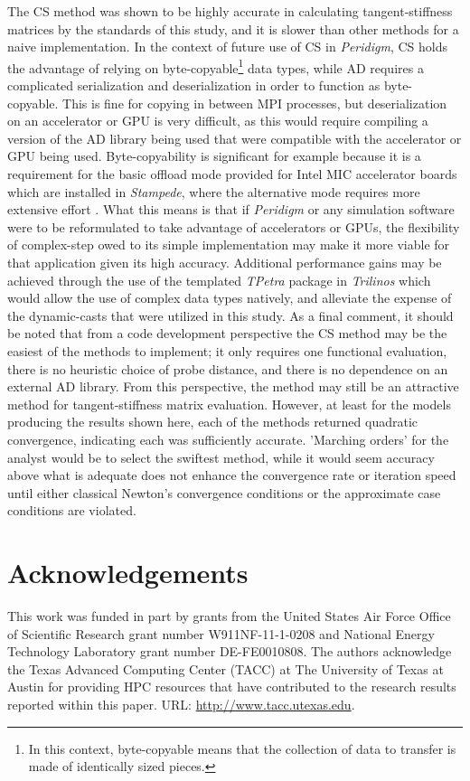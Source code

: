 \documentclass[preprint,12pt]{elsarticle}
\begin{document}
The CS method was shown to be highly accurate in calculating tangent-stiffness matrices by the standards of this study, and it is slower than other methods for a naive implementation. In the context of future use of CS in \emph{Peridigm}, CS holds the advantage of relying on byte-copyable\footnote{In this context,  byte-copyable means that the collection of data to transfer is made of identically sized pieces.} data types, while AD requires a complicated serialization and deserialization in order to function as byte-copyable. This is fine for copying in between MPI processes, but deserialization on an accelerator or GPU is very difficult, as this would require compiling a version of the AD library being used that were compatible with the accelerator or GPU being used.  Byte-copyability is significant for example because it is a requirement for the basic offload mode provided for Intel MIC accelerator boards which are installed in \emph{Stampede}, where the alternative mode requires more extensive effort \cite{intel_byte_copyable}. What this means is that if \emph{Peridigm} or any simulation software were to be reformulated to take advantage of accelerators or GPUs, the flexibility of complex-step owed to its simple implementation may make it more viable for that application given its high accuracy. Additional performance gains may be achieved through the use of the templated \emph{TPetra} package in \emph{Trilinos} which would allow the use of complex data types natively, and alleviate the expense of the dynamic-casts that were utilized in this study.  As a final comment, it should be noted that from a code development perspective the CS method may be the easiest of the methods to implement; it only requires one functional evaluation, there is no heuristic choice of probe distance, and there is no dependence on an external AD library.  From this perspective, the method may still be an attractive method for tangent-stiffness matrix evaluation. However, at least for the models producing the results shown here, each of the methods returned quadratic convergence, indicating each was sufficiently accurate. 'Marching orders' for the analyst would be to select the swiftest method, while it would seem accuracy above what is adequate does not enhance the convergence rate or iteration speed until either classical Newton's convergence conditions or the approximate case conditions are violated. 

\section{Acknowledgements}
\label{sec:ack}
This work was funded in part by grants from the United States Air Force Office of Scientific Research grant number W911NF-11-1-0208 and National Energy Technology Laboratory grant number DE-FE0010808. The authors acknowledge the Texas Advanced Computing Center (TACC) at The University of Texas at Austin for providing HPC resources that have contributed to the research results reported within this paper. URL: \url{http://www.tacc.utexas.edu}.
\end{document}
